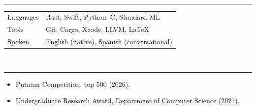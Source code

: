 \documentclass[11pt]{article}
\newcommand{\cvsection}[1]{\vspace{6pt}{\large\bfseries #1}\\[-6pt]\rule{\textwidth}{0.6pt}\vspace{2pt}}
\begin{document}
\cvsection{Skills}

\begin{tabular*}{\textwidth}{@{\extracolsep{\fill}}ll}
  Languages & Rust, Swift, Python, C, Standard ML \\
  Tools     & Git, Cargo, Xcode, LLVM, \LaTeX \\
  Spoken    & English (native), Spanish (conversational) \\
\end{tabular*}

\cvsection{Awards}

\begin{itemize}[nosep,leftmargin=1.5em]
  \item Putnam Competition, top 500 (2026).
  \item Undergraduate Research Award, Department of Computer Science (2027).
\end{itemize}
\end{document}
